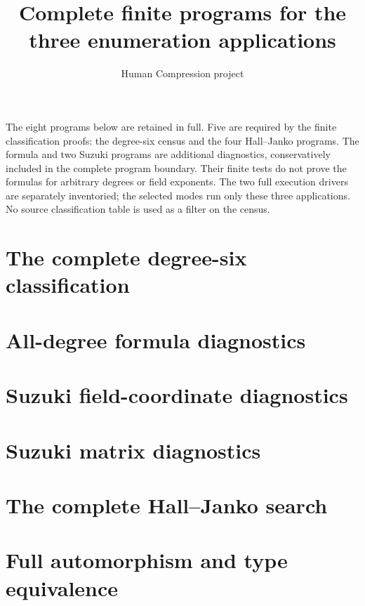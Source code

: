 
\title{Complete finite programs for the three enumeration applications}
\author{Human Compression project}
\date{}

\maketitle
The eight programs below are retained in full. Five are required by the
finite classification proofs: the degree-six census and the four Hall--Janko
programs. The formula and two Suzuki programs are additional diagnostics,
conservatively included in the complete program boundary. Their finite tests
do not prove the formulas for arbitrary degrees or field exponents. The two
full execution drivers are separately inventoried; the selected modes run
only these three applications. No source classification table is used as a
filter on the census.
\section{The complete degree-six classification}
\section{All-degree formula diagnostics}
\section{Suzuki field-coordinate diagnostics}
\section{Suzuki matrix diagnostics}
\section{The complete Hall--Janko search}
\section{Full automorphism and type equivalence}
